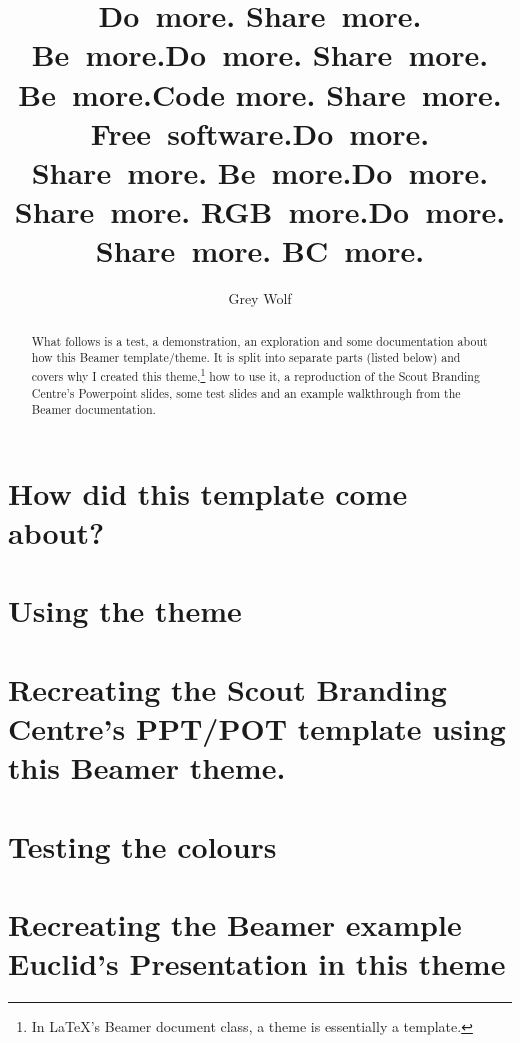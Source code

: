 \documentclass[aspectratio=169,utf8,t]{beamer}
\author{Grey Wolf}
\institute{\href{https://mansouthscouts.org.uk/our-groups/23rdManchester}{23rd~Manchester}
\\\href{https://mansouthscouts.org.uk/our-groups/23rdManchester}{(Birch~with~Fallowfield)}}
\title{Do~more. Share~more. Be~more.}
\begin{document}
\logoslide[noheadlogo]

\begin{frame}
\begin{abstract}
What follows is a test, a demonstration, an exploration and some documentation about how this Beamer template/theme.  It is split into separate parts (listed below) and covers why I created this theme,\footnote{In \LaTeX{}'s Beamer document class, a theme is essentially a template.} how to use it, a reproduction of the Scout Branding Centre's Powerpoint slides, some test slides and an example walkthrough from the Beamer documentation.
\end{abstract}
\end{frame}


\title{Do~more. Share~more. Be~more.}
\part{How did this template come about?}


\title{Code more. Share~more. Free~software.} 
\part{Using the theme}


\title{Do~more. Share~more. Be~more.}
\headervisibility[separate]
\part{Recreating the Scout Branding Centre's PPT/POT template using this Beamer theme.}

\headervisibility
\title{Do~more. Share~more. RGB~more.}
\part{Testing the colours}

\title{Do~more. Share~more. BC~more.}
\part{Recreating the Beamer example Euclid’s Presentation in this theme}
\end{document}
